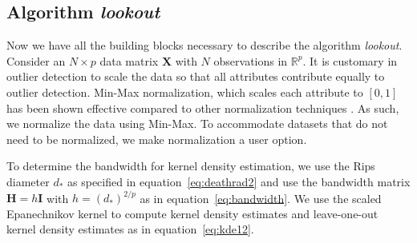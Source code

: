 \documentclass[letter,12pt]{article}
\begin{document}

   


\subsection{Algorithm \textit{lookout}}

Now we have all the building blocks necessary to describe the algorithm \textit{lookout}. Consider an $N \times p$  data matrix $\bm{X}$ with $N$ observations in $\mathbb{R}^p$.  It is customary in outlier detection to scale the data so that all attributes contribute equally to outlier detection. Min-Max normalization, which scales each attribute to $[0, 1]$ has been shown effective compared to other normalization  techniques \citep{kandanaarachchi2018normalization}. As such, we  normalize the data using Min-Max. To accommodate  datasets that do not need to be normalized, we make normalization a user option.

To determine the bandwidth for kernel density estimation, we use the Rips diameter $d_*$ as specified in equation~\eqref{eq:deathrad2} and use the bandwidth matrix $\bm{H} = h \bm{I}$ with $h = (d_*)^{2/p}$ as in equation~\eqref{eq:bandwidth}. We use the scaled Epanechnikov kernel to compute kernel density estimates and leave-one-out kernel density estimates as in equation~\eqref{eq:kde12}. 
\end{document}
